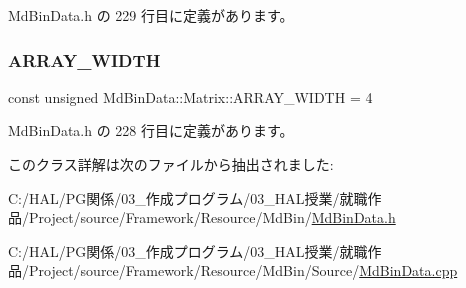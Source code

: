  Md\+Bin\+Data.\+h の 229 行目に定義があります。

\mbox{\label{class_md_bin_data_1_1_matrix_adbf2f2e21df64ab4559b9c98b88a6c59}} 
\subsubsection{\texorpdfstring{A\+R\+R\+A\+Y\+\_\+\+W\+I\+D\+TH}{ARRAY\_WIDTH}}
{\footnotesize\ttfamily const unsigned Md\+Bin\+Data\+::\+Matrix\+::\+A\+R\+R\+A\+Y\+\_\+\+W\+I\+D\+TH = 4\hspace{0.3cm}{\ttfamily [static]}}



 Md\+Bin\+Data.\+h の 228 行目に定義があります。



このクラス詳解は次のファイルから抽出されました\+:\begin{DoxyCompactItemize}
\item 
C\+:/\+H\+A\+L/\+P\+G関係/03\+\_\+作成プログラム/03\+\_\+\+H\+A\+L授業/就職作品/\+Project/source/\+Framework/\+Resource/\+Md\+Bin/\mbox{\hyperlink{_md_bin_data_8h}{Md\+Bin\+Data.\+h}}\item 
C\+:/\+H\+A\+L/\+P\+G関係/03\+\_\+作成プログラム/03\+\_\+\+H\+A\+L授業/就職作品/\+Project/source/\+Framework/\+Resource/\+Md\+Bin/\+Source/\mbox{\hyperlink{_md_bin_data_8cpp}{Md\+Bin\+Data.\+cpp}}\end{DoxyCompactItemize}
